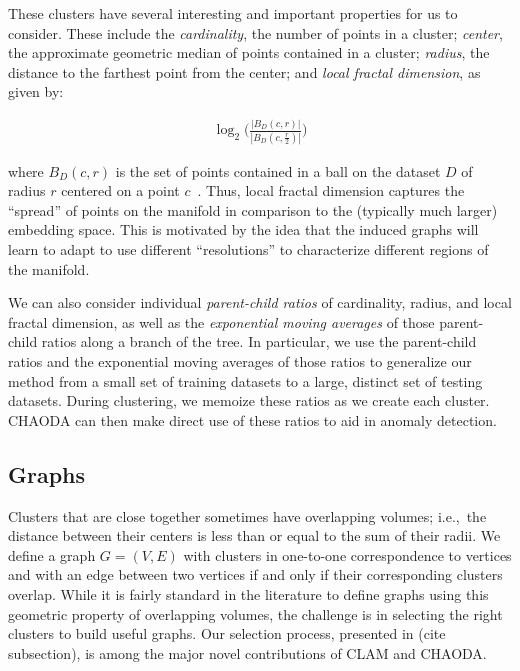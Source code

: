 These clusters have several interesting and important properties for us to consider.
These include the \textit{cardinality}, the number of points in a cluster;
\textit{center}, the approximate geometric median of points contained in a cluster;
\textit{radius}, the distance to the farthest point from the center;
and \textit{local fractal dimension},
as given by:

\begin{gather}
    \log_2\bigg(\frac{|B_D(c, r)|}{|B_D(c, \frac{r}{2})|}\bigg)
    \label{fractal-dimension}
\end{gather}

where $B_D(c,r)$ is the set of points contained in a ball on the dataset $D$ of radius $r$ centered on a point $c$~\cite{ishaq2019clustered}.
Thus, local fractal dimension captures the ``spread'' of points on the manifold in comparison to the (typically much larger) embedding space.
This is motivated by the idea that the induced graphs will learn to adapt to use different ``resolutions'' to characterize different regions of the manifold.

We can also consider individual \textit{parent-child ratios} of cardinality, radius, and local fractal dimension, as well as the \textit{exponential moving averages} of those parent-child ratios along a branch of the tree.
In particular, we use the parent-child ratios and the exponential moving averages of those ratios to generalize our method from a small set of training datasets to a large, distinct set of testing datasets.
During clustering, we memoize these ratios as we create each cluster.
CHAODA can then make direct use of these ratios to aid in anomaly detection.


\subsection{Graphs}
\label{subsec:methods:graphs}

Clusters that are close together sometimes have overlapping volumes; i.e.,\ the distance between their centers is less than or equal to the sum of their radii.
We define a graph $G=(V,E)$ with clusters in one-to-one correspondence to vertices and with an edge between two vertices if and only if their corresponding clusters overlap.
While it is fairly standard in the literature to define graphs using this geometric property of overlapping volumes, the challenge is in selecting the right clusters to build useful graphs.
Our selection process, presented in (cite subsection), is among the major novel contributions of CLAM and CHAODA.


